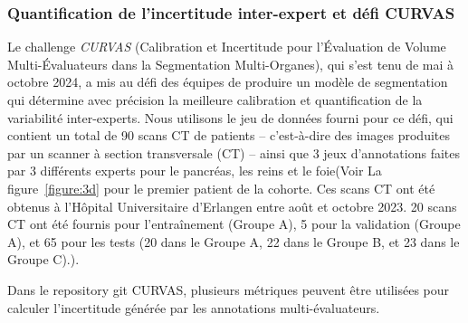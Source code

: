 \documentclass[a4paper,french,bookmarks,12pt]{article}
\begin{document}
\subsubsection{Quantification de l'incertitude inter-expert et défi CURVAS}

Le challenge \emph{CURVAS} (Calibration et Incertitude pour l'Évaluation de Volume Multi-Évaluateurs dans la Segmentation Multi-Organes), qui s'est tenu de mai à octobre 2024, a mis au défi des équipes de produire un modèle de segmentation qui détermine avec précision la meilleure calibration et quantification de la variabilité inter-experts. Nous utilisons le jeu de données fourni pour ce défi, qui contient un total de 90 scans CT de patients -- c'est-à-dire des images produites par un scanner à section transversale (CT) -- ainsi que 3 jeux d'annotations faites par 3 différents experts pour le pancréas, les reins et le foie(Voir La figure~\ref{figure:3d} pour le premier patient de la cohorte. Ces scans CT ont été obtenus à l'Hôpital Universitaire d'Erlangen entre août et octobre 2023. 20 scans CT ont été fournis pour l'entraînement (Groupe A), 5 pour la validation (Groupe A), et 65 pour les tests (20 dans le Groupe A, 22 dans le Groupe B, et 23 dans le Groupe C).). 

Dans le repository git CURVAS, plusieurs métriques peuvent être utilisées pour calculer l'incertitude générée par les annotations multi-évaluateurs.
\end{document}

